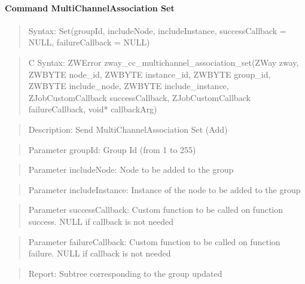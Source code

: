 \paragraph{Command MultiChannelAssociation Set}
\begin{quote}Syntax: Set(groupId, includeNode, includeInstance, successCallback = NULL, failureCallback = NULL)\end{quote}
\begin{quote}C Syntax: ZWError zway\_cc\_multichannel\_association\_set(ZWay zway, ZWBYTE node\_id, ZWBYTE instance\_id, ZWBYTE group\_id, ZWBYTE include\_node, ZWBYTE include\_instance, ZJobCustomCallback successCallback, ZJobCustomCallback failureCallback, void* callbackArg)\end{quote}
\begin{quote}Description: Send MultiChannelAssociation Set (Add)\end{quote}
\begin{quote}Parameter groupId: Group Id (from 1 to 255)\end{quote}
\begin{quote}Parameter includeNode: Node to be added to the group\end{quote}
\begin{quote}Parameter includeInstance: Instance of the node to be added to the group\end{quote}
\begin{quote}Parameter successCallback: Custom function to be called on function success. NULL if callback is not needed\end{quote}
\begin{quote}Parameter failureCallback: Custom function to be called on function failure. NULL if callback is not needed\end{quote}
\begin{quote}Report: Subtree corresponding to the group updated\end{quote}

